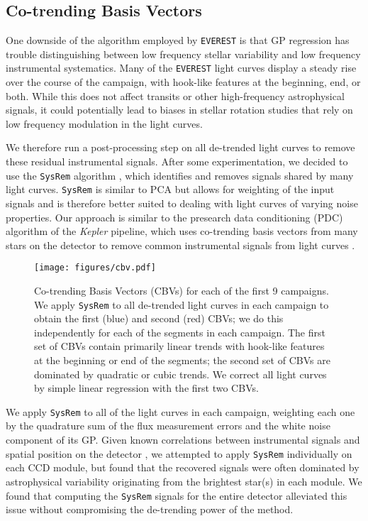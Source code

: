 \documentclass[]{emulateapj}
\begin{document}
\subsection{Co-trending Basis Vectors}
\label{sec:cbvs}
One downside of the algorithm employed by \texttt{EVEREST} is that GP regression has trouble
distinguishing between low frequency stellar variability and low frequency instrumental
systematics. Many of the \texttt{EVEREST} light curves display a steady rise over the
course of the campaign, with hook-like features at the beginning, end, or both. While this
does not affect transits or other high-frequency astrophysical signals, it could potentially
lead to biases in stellar rotation studies that rely on low frequency modulation in the
light curves.

We therefore run a post-processing step on all de-trended light curves to remove these
residual instrumental signals. After some experimentation, we decided to use the
\texttt{SysRem} algorithm \citep{Tamuz05}, which identifies and removes signals shared by many
light curves. \texttt{SysRem} is similar to PCA but allows for weighting of the input
signals and is therefore better suited to dealing with light curves of varying noise
properties. Our approach is similar to the presearch data conditioning (PDC) algorithm
of the \emph{Kepler} pipeline, which uses co-trending basis vectors from many stars
on the detector to remove common instrumental signals from light curves \citep{Stumpe12,Smith12}.

\begin{figure}[hbt]
  \begin{center}
      \texttt{[image: figures/cbv.pdf]}
      \caption{Co-trending Basis Vectors (CBVs) for each of the first 9 campaigns. 
         We apply \texttt{SysRem} to all de-trended light curves 
         in each campaign to obtain the first (blue) and second (red) CBVs; we do this
         independently for each of the segments in each campaign.
         The first set of CBVs contain primarily linear trends with hook-like
         features at the beginning or end of the segments; the second set of CBVs are
         dominated by quadratic or cubic trends. We correct all 
         light curves by simple
         linear regression with the first two CBVs.}
     \label{fig:cbv}
  \end{center}
\end{figure}

We apply \texttt{SysRem} to all of the light curves in each campaign, weighting each one
by the quadrature sum of the flux measurement errors and the white noise component of its
GP. Given known correlations between instrumental signals and spatial position on the
detector \citep[e.g.,][]{Petigura12,Wang16}, we attempted to apply \texttt{SysRem} individually
on each CCD module, but found that the recovered signals were often dominated by
astrophysical variability originating from the brightest star(s) in each module. 
We found that computing the \texttt{SysRem} signals for the entire detector alleviated 
this issue without compromising the de-trending power of the method.
\end{document}
